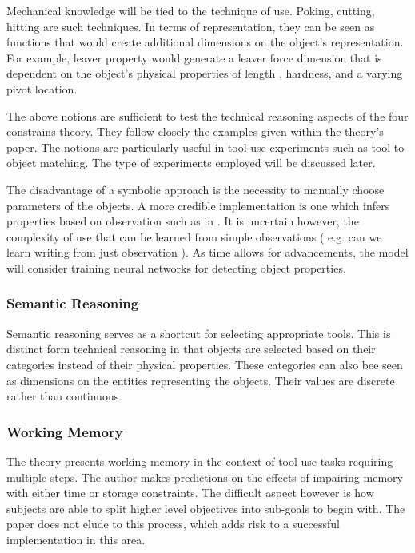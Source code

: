 \documentclass[11]{article}
\begin{document}
Mechanical knowledge will be tied to the technique of use. Poking, cutting, hitting are such techniques. In terms of representation, they can be seen as functions that would create additional dimensions on the object's representation. For example, leaver property would generate a leaver force dimension that is dependent on the object's physical properties of length , hardness, and a varying pivot location.  

The above notions are sufficient to test the technical reasoning aspects of the four constrains theory. They follow closely the examples given within the theory's paper. The notions are particularly useful in tool use experiments such as tool to object matching. The type of experiments employed will be discussed later.  

The disadvantage of a symbolic approach is the necessity to manually choose parameters of the objects. A more credible implementation is one which infers properties based on observation such as in \cite{zhu2015}. It is uncertain however, the complexity of use that can be learned from simple observations ( e.g. can we learn writing from just observation ).  As time allows for advancements, the model will consider training neural networks for detecting object properties.

\subsubsection*{Semantic Reasoning}

Semantic reasoning serves as a shortcut for selecting appropriate tools. This is distinct form technical reasoning in that objects are selected based on their categories instead of their physical properties. These categories can also bee seen as dimensions on the entities representing the objects. Their values are discrete rather than continuous. 

\subsubsection*{Working Memory}

The theory presents working memory in the context of tool use tasks requiring multiple steps. The author makes predictions on the effects of impairing memory with either time or storage constraints\cite{osiurak2014}. The difficult aspect however is how subjects are able to split higher level objectives into sub-goals to begin with. The paper does not elude to this process, which adds risk to a successful implementation in this area. 
\end{document}
